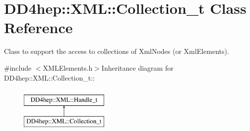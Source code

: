 \hypertarget{class_d_d4hep_1_1_x_m_l_1_1_collection__t}{
\section{DD4hep::XML::Collection\_\-t Class Reference}
\label{class_d_d4hep_1_1_x_m_l_1_1_collection__t}
}


Class to support the access to collections of XmlNodes (or XmlElements).  


{\ttfamily \#include $<$XMLElements.h$>$}Inheritance diagram for DD4hep::XML::Collection\_\-t::\begin{figure}[H]
\begin{center}
\leavevmode
\includegraphics[height=2cm]{class_d_d4hep_1_1_x_m_l_1_1_collection__t}
\end{center}
\end{figure}
